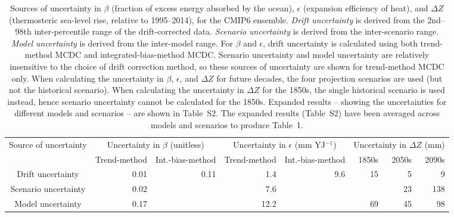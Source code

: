 \begin{table*}[t]
\centering
\caption{Sources of uncertainty in $\beta$ (fraction of excess energy absorbed by the ocean), $\epsilon$ (expansion efficiency of heat), and ${\Delta}Z$ (thermosteric sea-level rise, relative to 1995--2014), for the CMIP6 ensemble. \emph{Drift uncertainty} is derived from the 2nd--98th inter-percentile range of the drift-corrected data. \emph{Scenario uncertainty} is derived from the inter-scenario range. \emph{Model uncertainty} is derived from the inter-model range. For $\beta$ and $\epsilon$, drift uncertainty is calculated using both trend-method MCDC and integrated-bias-method MCDC. Scenario uncertainty and model uncertainty are relatively insensitive to the choice of drift correction method, so these sources of uncertainty are shown for trend-method MCDC only. When calculating the uncertainty in $\beta$, $\epsilon$, and ${\Delta}Z$ for future decades, the four projection scenarios are used (but not the historical scenario). When calculating the uncertainty in ${\Delta}Z$ for the 1850s, the single historical scenario is used instead, hence scenario uncertainty cannot be calculated for the 1850s. Expanded results -- showing the uncertainties for different models and scenarios -- are shown in Table~S2. The expanded results (Table~S2) have been averaged across models and scenarios to produce Table~1.}
\begin{tabular}{c|rr|rr|rrr}
\toprule
Source of uncertainty & \multicolumn{2}{c|}{Uncertainty in $\beta$ (unitless)} & \multicolumn{2}{c|}{Uncertainty in $\epsilon$ (mm YJ$^{-1}$)} & \multicolumn{3}{c}{Uncertainty in ${\Delta}Z$ (mm)} \\
 & Trend-method & Int.-bias-method & Trend-method & Int.-bias-method & 1850s & 2050s & 2090s \\
\midrule
Drift uncertainty & 0.01 & 0.11 & 1.4 & 9.6 & 15 & 5 & 9 \\
Scenario uncertainty & 0.02 &  & 7.6 &  &  & 23 & 138 \\
Model uncertainty & 0.17 &  & 12.2 &  & 69 & 45 & 98 \\
\bottomrule
\end{tabular}
\end{table*}
